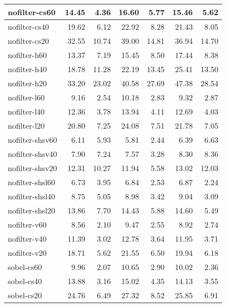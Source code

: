 \begin{tabular}{lrrrrrr}
\toprule
nofilter-cs60       &   14.45 &    4.36 &   16.60 &    5.77 &   15.46 &    5.62 \\
\midrule
nofilter-cs40       &   19.62 &    6.12 &   22.92 &    8.28 &   21.43 &    8.05 \\
nofilter-cs20       &   32.55 &   10.74 &   39.00 &   14.81 &   36.94 &   14.70 \\
nofilter-h60        &   13.37 &    7.19 &   15.45 &    8.50 &   17.44 &    8.38 \\
nofilter-h40        &   18.78 &   11.28 &   22.19 &   13.45 &   25.41 &   13.50 \\
nofilter-h20        &   33.20 &   23.02 &   40.58 &   27.69 &   47.38 &   28.54 \\
nofilter-l60        &    9.16 &    2.54 &   10.18 &    2.83 &    9.32 &    2.87 \\
nofilter-l40        &   12.36 &    3.78 &   13.94 &    4.11 &   12.69 &    4.03 \\
nofilter-l20        &   20.80 &    7.25 &   24.08 &    7.51 &   21.78 &    7.05 \\
nofilter-shsv60     &    6.11 &    5.93 &    5.81 &    2.44 &    6.39 &    6.63 \\
nofilter-shsv40     &    7.90 &    7.24 &    7.57 &    3.28 &    8.30 &    8.36 \\
nofilter-shsv20     &   12.31 &   10.27 &   11.94 &    5.58 &   13.02 &   12.03 \\
nofilter-shsl60     &    6.73 &    3.95 &    6.84 &    2.53 &    6.87 &    2.24 \\
nofilter-shsl40     &    8.75 &    5.05 &    8.98 &    3.42 &    9.04 &    3.09 \\
nofilter-shsl20     &   13.86 &    7.70 &   14.43 &    5.88 &   14.60 &    5.49 \\
nofilter-v60        &    8.56 &    2.10 &    9.47 &    2.55 &    8.92 &    2.74 \\
nofilter-v40        &   11.39 &    3.02 &   12.78 &    3.64 &   11.95 &    3.71 \\
nofilter-v20        &   18.71 &    5.62 &   21.55 &    6.50 &   19.94 &    6.18 \\
sobel-cs60          &    9.96 &    2.07 &   10.65 &    2.90 &   10.02 &    2.36 \\
sobel-cs40          &   13.88 &    3.16 &   15.02 &    4.35 &   14.13 &    3.55 \\
sobel-cs20          &   24.76 &    6.49 &   27.32 &    8.52 &   25.85 &    6.91 \\

\end{tabular}
